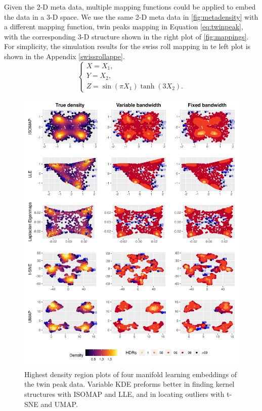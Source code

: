 \documentclass[11pt,a4paper,]{article}
\begin{document}
Given the 2-D meta data, multiple mapping functions could be applied to embed the data in a 3-D space. We use the same 2-D meta data in \autoref{fig:metadensity} with a different mapping function, twin peaks
mapping in Equation \eqref{eq:twinpeak}, with the corresponding 3-D structure shown in the right plot of \autoref{fig:mappings}. For simplicity, the simulation results for the swiss roll mapping in te left plot is shown in the Appendix \autoref{swissrollappe}.
\begin{equation}
\label{eq:twinpeak}
\left\{ 
\begin{array}{lcl}
X = X_1, \\
Y = X_2, \\
Z = \sin(\pi X_1) \tanh (3 X_2).
\end{array}
\right.
\end{equation}

\begin{figure}

{\centering \includegraphics[width=0.95\linewidth]{figures/Twin Peak5levels_outliers_comparison_4ml_3cases_riem0_1} 

}

\caption{Highest density region plots of four manifold learning embeddings of the twin peak data. Variable KDE preforms better in finding kernel structures with ISOMAP and LLE, and in locating outliers with t-SNE and UMAP.}\label{fig:tpoutliers}
\end{figure}
\end{document}
